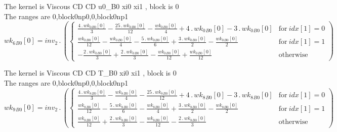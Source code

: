 \documentclass{article}
\begin{document}
\noindent The kernel is Viscous CD CD u0_B0 xi0 xi1 , block is 0\\\noindent The ranges are 0,block0np0,0,block0np1\\\begin{dmath}{wk_{6}{_{B0}}}[{0}] = inv_2 \,.\, \left(\begin{cases} \frac{4 \,.\, {wk_{0}{_{B0}}}[{0}]}{3} - \frac{25 \,.\, {wk_{0}{_{B0}}}[{0}]}{12} - \frac{{wk_{0}{_{B0}}}[{0}]}{4} + 4 \,.\, {wk_{0}{_{B0}}}[{0}] - 3 \,.\, {wk_{0}{_{B0}}}[{0}] & 
\text{for}\: {idx}[{1}] = 0 \\\frac{{wk_{0}{_{B0}}}[{0}]}{12} - \frac{{wk_{0}{_{B0}}}[{0}]}{4} - \frac{5 \,.\, {wk_{0}{_{B0}}}[{0}]}{6} + \frac{3 \,.\, {wk_{0}{_{B0}}}[{0}]}{2} - \frac{{wk_{0}{_{B0}}}[{0}]}{2} & \text{for}\: {idx}[{1}] = 1 \\- 
\frac{2 \,.\, {wk_{0}{_{B0}}}[{0}]}{3} + \frac{2 \,.\, {wk_{0}{_{B0}}}[{0}]}{3} - \frac{{wk_{0}{_{B0}}}[{0}]}{12} + \frac{{wk_{0}{_{B0}}}[{0}]}{12} & \text{otherwise} \end{cases}\right)\end{dmath}

\noindent The kernel is Viscous CD CD T_B0 xi0 xi1 , block is 0\\\noindent The ranges are 0,block0np0,0,block0np1\\\begin{dmath}{wk_{9}{_{B0}}}[{0}] = inv_2 \,.\, \left(\begin{cases} \frac{4 \,.\, {wk_{8}{_{B0}}}[{0}]}{3} - \frac{{wk_{8}{_{B0}}}[{0}]}{4} - \frac{25 \,.\, {wk_{8}{_{B0}}}[{0}]}{12} + 4 \,.\, {wk_{8}{_{B0}}}[{0}] - 3 \,.\, {wk_{8}{_{B0}}}[{0}] & 
\text{for}\: {idx}[{1}] = 0 \\\frac{{wk_{8}{_{B0}}}[{0}]}{12} - \frac{5 \,.\, {wk_{8}{_{B0}}}[{0}]}{6} - \frac{{wk_{8}{_{B0}}}[{0}]}{4} + \frac{3 \,.\, {wk_{8}{_{B0}}}[{0}]}{2} - \frac{{wk_{8}{_{B0}}}[{0}]}{2} & \text{for}\: {idx}[{1}] = 1 
\\\frac{{wk_{8}{_{B0}}}[{0}]}{12} + \frac{2 \,.\, {wk_{8}{_{B0}}}[{0}]}{3} - \frac{{wk_{8}{_{B0}}}[{0}]}{12} - \frac{2 \,.\, {wk_{8}{_{B0}}}[{0}]}{3} & \text{otherwise} \end{cases}\right)\end{dmath}
\end{document}
